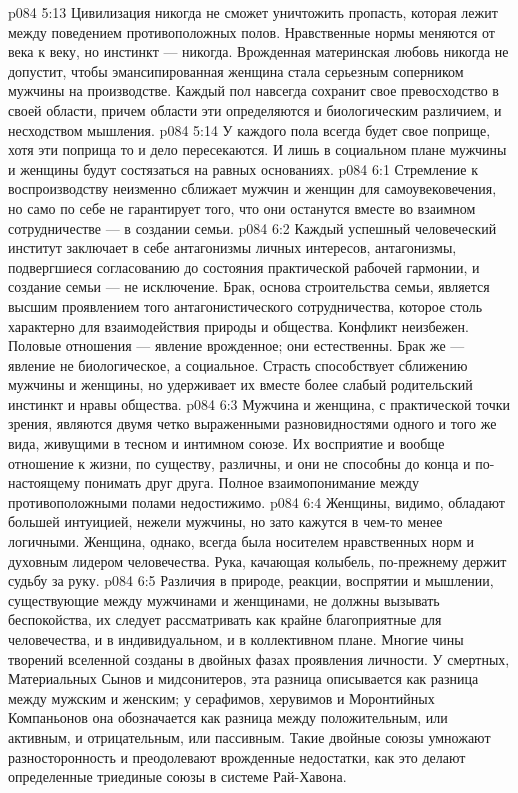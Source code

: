 \vs p084 5:13 Цивилизация никогда не сможет уничтожить пропасть, которая лежит между поведением противоположных полов. Нравственные нормы меняются от века к веку, но инстинкт --- никогда. Врожденная материнская любовь никогда не допустит, чтобы эмансипированная женщина стала серьезным соперником мужчины на производстве. Каждый пол навсегда сохранит свое превосходство в своей области, причем области эти определяются и биологическим различием, и несходством мышления.
\vs p084 5:14 У каждого пола всегда будет свое поприще, хотя эти поприща то и дело пересекаются. И лишь в социальном плане мужчины и женщины будут состязаться на равных основаниях.
\vs p084 6:1 Стремление к воспроизводству неизменно сближает мужчин и женщин для самоувековечения, но само по себе не гарантирует того, что они останутся вместе во взаимном сотрудничестве --- в создании семьи.
\vs p084 6:2 Каждый успешный человеческий институт заключает в себе антагонизмы личных интересов, антагонизмы, подвергшиеся согласованию до состояния практической рабочей гармонии, и создание семьи --- не исключение. Брак, основа строительства семьи, является высшим проявлением того антагонистического сотрудничества, которое столь характерно для взаимодействия природы и общества. Конфликт неизбежен. Половые отношения --- явление врожденное; они естественны. Брак же --- явление не биологическое, а социальное. Страсть способствует сближению мужчины и женщины, но удерживает их вместе более слабый родительский инстинкт и нравы общества.
\vs p084 6:3 \pc Мужчина и женщина, с практической точки зрения, являются двумя четко выраженными разновидностями одного и того же вида, живущими в тесном и интимном союзе. Их восприятие и вообще отношение к жизни, по существу, различны, и они не способны до конца и по\hyp{}настоящему понимать друг друга. Полное взаимопонимание между противоположными полами недостижимо.
\vs p084 6:4 Женщины, видимо, обладают большей интуицией, нежели мужчины, но зато кажутся в чем\hyp{}то менее логичными. Женщина, однако, всегда была носителем нравственных норм и духовным лидером человечества. Рука, качающая колыбель, по\hyp{}прежнему держит судьбу за руку.
\vs p084 6:5 \pc Различия в природе, реакции, воспрятии и мышлении, существующие между мужчинами и женщинами, не должны вызывать беспокойства, их следует рассматривать как крайне благоприятные для человечества, и в индивидуальном, и в коллективном плане. Многие чины творений вселенной созданы в двойных фазах проявления личности. У смертных, Материальных Сынов и мидсонитеров, эта разница описывается как разница между мужским и женским; у серафимов, херувимов и Моронтийных Компаньонов она обозначается как разница между положительным, или активным, и отрицательным, или пассивным. Такие двойные союзы умножают разносторонность и преодолевают врожденные недостатки, как это делают определенные триединые союзы в системе Рай\hyp{}Хавона.
